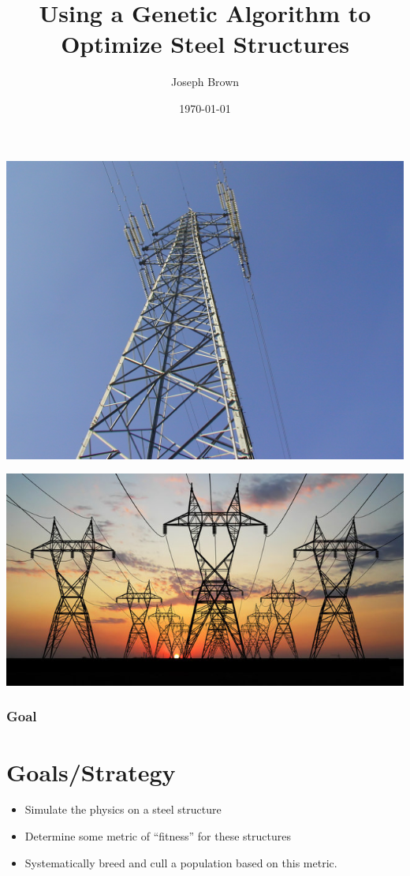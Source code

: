 \documentclass[xcolor=dvipsnames]{beamer}
\title{Using a Genetic Algorithm to Optimize Steel Structures}
\author{Joseph Brown}
\institute{Tarleton State University}
\date{\today}
\begin{document}
\frame{\titlepage}

\begin{frame}
\begin{center}
\includegraphics[scale = 0.15]{Steel_tower.jpg}
\end{center}
\end{frame}

\begin{frame}
\begin{center}
\includegraphics[scale = 0.4]{Steel_tower2.jpg}
\end{center}
\end{frame}

\begin{frame}
\frametitle{Goal \hfill}
\section{Goals/Strategy}	

\begin{itemize}
\item Simulate the physics on a steel structure
\item Determine some metric of ``fitness'' for these structures
\item Systematically breed and cull a population based on this metric.
\end{itemize}
\end{frame}
\end{document}
